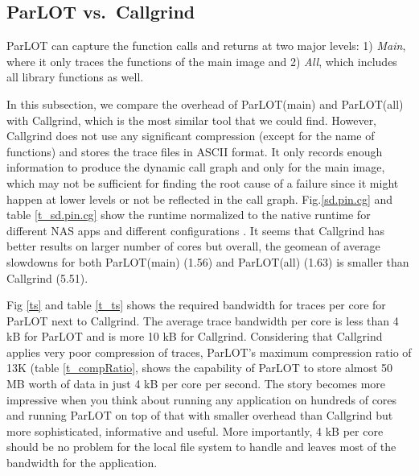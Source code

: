 
\subsection{ParLOT vs.~Callgrind}
ParLOT can capture the function calls and returns at two major levels: 1) \textit{Main}, where it only traces the functions of the main image and 2) \textit{All}, which includes all library functions as well.

In this subsection, we compare the overhead of ParLOT(main) and ParLOT(all) with Callgrind, which is the most similar tool that we could find.
However, Callgrind does not use any significant compression (except for the name of functions) and stores the trace files in ASCII format. It only records enough information to produce the dynamic call graph and only for the main image, which may not be sufficient for finding the root cause of a failure since it might happen at lower levels or not be reflected in the call graph.
Fig.\ref{sd.pin.cg} and table \ref{t_sd.pin.cg} show the runtime normalized to the native runtime for different NAS apps and different configurations .
It seems that Callgrind has better results on larger number of cores but overall, the geomean of average slowdowns for both ParLOT(main) (1.56) and ParLOT(all) (1.63) is smaller than Callgrind (5.51).

Fig \ref{ts} and table \ref{t_ts} shows the required bandwidth for traces per core for ParLOT next to Callgrind.
The average trace bandwidth per core is less than 4 kB for ParLOT and is more 10 kB for Callgrind. Considering that Callgrind applies very poor compression of traces, ParLOT's maximum compression ratio of 13K (table \ref{t_compRatio},  shows the capability of ParLOT to store almost 50 MB worth of data in just 4 kB per core per second. The story becomes more impressive when you think about running any application on hundreds of cores and running ParLOT on top of that with smaller overhead than Callgrind but more sophisticated, informative and useful.
More importantly, 4 kB per core should be no problem for the local file system to handle and leaves most of the bandwidth for the application.

